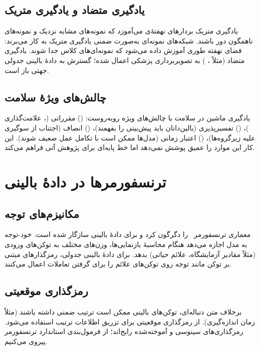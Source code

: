 \subsection{یادگیری متضاد و یادگیری متریک}

یادگیری متریک بردارهای نهفتۀی می‌آموزد که نمونه‌های مشابه نزدیک و نمونه‌های ناهمگون دور باشند. شبکه‌های نمونه‌ای به‌صورت ضمنی یادگیری متریک به کار می‌برند: فضای نهفته طوری آموزش داده می‌شود که نمونه‌ای‌های کلاس جدا شوند. یادگیری متضاد (مثلاً ، ) به تصویربرداری پزشکی اعمال شده؛ گسترش به دادۀ بالینی جدولی جهتی باز است.

\subsection{چالش‌های ویژۀ سلامت}

یادگیری ماشین در سلامت با چالش‌های ویژه روبه‌روست: () مقرراتی (، علامت‌گذاری )، () تفسیرپذیری (بالین‌دانان باید پیش‌بینی را بفهمند)، () انصاف (اجتناب از سوگیری علیه زیرگروه‌ها)، () اعتبار زمانی (مدل‌ها ممکن است با تکامل عمل ضعیف شوند). این کار این موارد را عمیق پوشش نمی‌دهد اما خط پایه‌ای برای پژوهش آتی فراهم می‌کند.

\section{ترنسفورمرها در دادۀ بالینی}

\subsection{مکانیزم‌های توجه}

معماری ترنسفورمر~\cite{vaswani2017attention,devlin2019bert}  را دگرگون کرد و برای دادۀ بالینی سازگار شده است. خود-توجه به مدل اجازه می‌دهد هنگام محاسبۀ بازنمایی‌ها، وزن‌های مختلف به توکن‌های ورودی (مثلاً مقادیر آزمایشگاه، علائم حیاتی) بدهد. برای دادۀ بالینی جدولی، رمزگذارهای مبتنی بر توکن مانند  توجه روی توکن‌های علائم را برای گرفتن تعاملات اعمال می‌کنند.

\subsection{رمزگذاری موقعیتی}

برخلاف متن دنباله‌ای، توکن‌های بالینی ممکن است ترتیب ضمنی داشته باشند (مثلاً زمان اندازه‌گیری). از رمزگذاری موقعیتی برای تزریق اطلاعات ترتیب استفاده می‌شود. رمزگذاری‌های سینوسی و آموخته‌شده رایج‌اند؛ از فرمول‌بندی استاندارد ترنسفورمر پیروی می‌کنیم.

